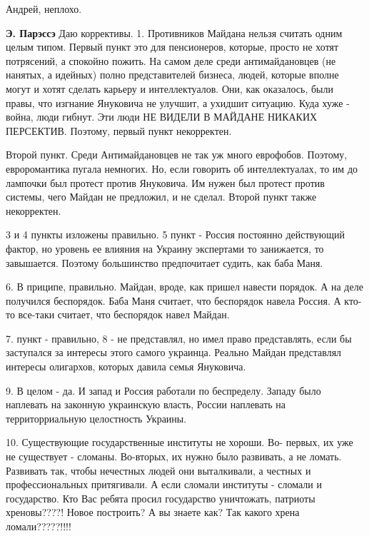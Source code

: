 \begin{itemize}
Андрей, неплохо.


\textbf{Э. Парэссэ} Даю коррективы. 1. Противников Майдана нельзя считать одним целым
типом. Первый пункт это для пенсионеров, которые, просто не хотят потрясений, а
спокойно пожить. На самом деле среди антимайдановцев (не нанятых, а идейных)
полно представителей бизнеса, людей, которые вполне могут и хотят сделать
карьеру и интеллектуалов. Они, как оказалось, были правы, что изгнание
Януковича не улучшит, а ухидшит ситуацию. Куда хуже - война, люди гибнут. Эти
люди НЕ ВИДЕЛИ В МАЙДАНЕ НИКАКИХ ПЕРСЕКТИВ. Поэтому, первый пункт некорректен.


Второй пункт. Среди Антимайдановцев не так уж много еврофобов. Поэтому,
евроромантика пугала немногих. Но, если говорить об интеллектуалах, то им до
лампочки был протест против Януковича. Им нужен был протест против системы,
чего Майдан не предложил, и не сделал. Второй пункт также некорректен.


3 и 4 пункты изложены правильно. 5 пункт - Россия постоянно действующий фактор,
но уровень ее влияния на Украину экспертами то занижается, то завышается.
Поэтому большинство предпочитает судить, как баба Маня.


6. В приципе, правильно. Майдан, вроде, как пришел навести порядок. А на деле
получился беспорядок. Баба Маня считает, что беспорядок навела Россия. А кто-то
все-таки считает, что беспорядок навел Майдан.



7. пункт - правильно, 8 - не представлял, но имел право представлять, если бы
заступался за интересы этого самого украинца. Реально Майдан представлял
интересы олигархов, которых давила семья Януковича.


9. В целом - да. И запад и Россия работали по беспределу. Западу было наплевать
на законную украинскую власть, России наплевать на территорриальную целостность
Украины.


10. Существующие государственные институты не хороши. Во- первых, их уже не
существует - сломаны. Во-вторых, их нужно было развивать, а не ломать.
Развивать так, чтобы нечестных людей они выталкивали, а честных и
профессиональных притягивали. А если сломали институты - сломали и государство.
Кто Вас ребята просил государство уничтожать, патриоты хреновы????! Новое
построить? А вы знаете как? Так какого хрена ломали?????!!!!


\end{itemize}
